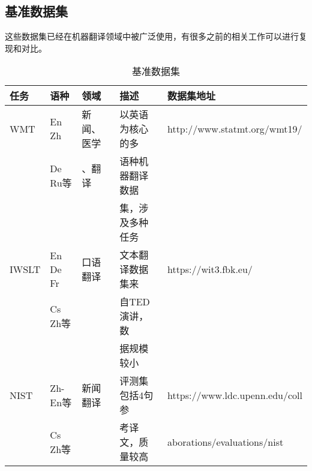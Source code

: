 \begin{appendices}

\section{基准数据集}
\parinterval 这些数据集已经在机器翻译领域中被广泛使用，有很多之前的相关工作可以进行复现和对比。

\begin{table}[htp]{
\footnotesize
\begin{center}
\caption{基准数据集}
\label{tab:Reference-data-set}
\begin{tabular}{p{1.6cm} | p{1.2cm} p{1.6cm} p{2.6cm} p{3.9cm}}
{任务} & {语种} &{领域} &{描述} &{数据集地址} \\
\hline
\rule{0pt}{15pt}WMT & En Zh& 新闻、医学 & 以英语为核心的多& {http://www.statmt.org/wmt19/} \\
 & De Ru等 & 、翻译 & 语种机器翻译数据 & \\
 & & & 集，涉及多种任务 & \\
\rule{0pt}{15pt}IWSLT & En De Fr & 口语翻译 & 文本翻译数据集来 & {https://wit3.fbk.eu/} \\
 &  Cs Zh等 &  &自TED演讲，数 & \\
 &  &  & 据规模较小 & \\
\rule{0pt}{15pt}NIST & Zh-En等 & 新闻翻译 & 评测集包括4句参 & {https://www.ldc.upenn.edu/coll} \\
 &  Cs Zh等 &  & 考译文，质量较高 & aborations/evaluations/nist \\
\end{tabular}
\end{center}
}\end{table}


\end{appendices}
